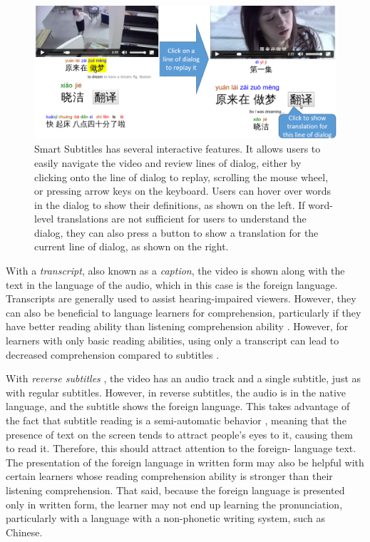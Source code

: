 \documentclass{sigchi}
\begin{document}
\begin{figure}[bp]
\centering
\includegraphics[width=2\columnwidth]{seekdialog-horizontal-translate-cropped}
\caption{Smart Subtitles has several interactive features. It allows users to easily navigate the video and
review lines of dialog, either by clicking onto the line of dialog to replay,
scrolling the mouse wheel,
or pressing arrow keys on the keyboard. Users can hover over words
in the dialog to show their definitions, as shown on the left.
If word-level translations are not sufficient for users to understand the dialog, they can also press a button to show a translation for the current
line of dialog, as shown on the right.}
\label{fig:figure25}
\end{figure}

With a \emph{transcript}, also known as a \emph{caption}, the video is shown along with the text in the
language of the audio, which in this case is the foreign language. Transcripts are generally used to
assist hearing-impaired viewers. However, they can also be beneficial to language learners for
comprehension, particularly if they have better reading ability than
listening comprehension ability \cite{danan2004captioning}. However,
for learners with only basic reading abilities,
using only a transcript can lead to decreased comprehension compared to subtitles \cite{bianchi2008captions}.



With \emph{reverse subtitles} \cite{danan1992reversed}, the video has an audio track and a single subtitle, just as with regular
subtitles. However, in reverse subtitles, the audio is in the native language, and
the subtitle shows the foreign language. This takes advantage of the fact that subtitle reading is
a semi-automatic behavior \cite{d2002foreign}, meaning that the presence of text on the screen tends to attract
people's eyes to it, causing them to read it. Therefore, this should attract attention to the foreign-
language text. The presentation of the foreign language in written form may also be helpful with
certain learners whose reading comprehension ability is stronger than their listening
comprehension. That said, because the foreign language is presented only in written form, the
learner may not end up learning the pronunciation, particularly with a language with a non-phonetic writing system, such as Chinese.
\end{document}
